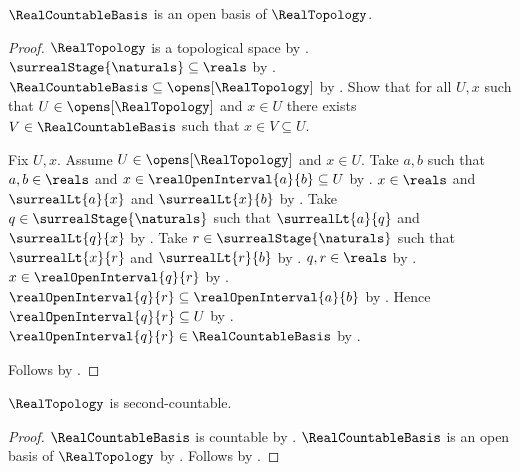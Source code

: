 \begin{theorem}\label{real_countable_basis_is_open_basis}
    $\RealCountableBasis$ is an open basis of $\RealTopology$.
\end{theorem}
\begin{proof}
    $\RealTopology$ is a topological space by .
    $\surrealStage{\naturals}\subseteq\reals$ by .
    $\RealCountableBasis\subseteq\opens[\RealTopology]$ by
        .
    Show that for all $U,x$ such that $U\in\opens[\RealTopology]$ and $x\in U$
        there exists $V\in\RealCountableBasis$ such that $x\in V\subseteq U$.
    \begin{subproof}
        Fix $U,x$.
        Assume $U\in\opens[\RealTopology]$ and $x\in U$.
        Take $a,b$ such that $a,b\in\reals$ and
            $x\in\realOpenInterval{a}{b}\subseteq U$ by
            .
        $x\in\reals$ and $\surrealLt{a}{x}$ and $\surrealLt{x}{b}$ by
            .
        Take $q\in\surrealStage{\naturals}$ such that $\surrealLt{a}{q}$ and
            $\surrealLt{q}{x}$ by .
        Take $r\in\surrealStage{\naturals}$ such that $\surrealLt{x}{r}$ and
            $\surrealLt{r}{b}$ by .
        $q,r\in\reals$ by .
        $x\in\realOpenInterval{q}{r}$ by .
        $\realOpenInterval{q}{r}\subseteq\realOpenInterval{a}{b}$ by
            .
        Hence $\realOpenInterval{q}{r}\subseteq U$ by .
        $\realOpenInterval{q}{r}\in\RealCountableBasis$ by .
    \end{subproof}
    Follows by .
\end{proof}

\begin{theorem}\label{real_topology_is_second_countable}
    $\RealTopology$ is second-countable.
\end{theorem}
\begin{proof}
    $\RealCountableBasis$ is countable by .
    $\RealCountableBasis$ is an open basis of $\RealTopology$ by .
    Follows by .
\end{proof}
